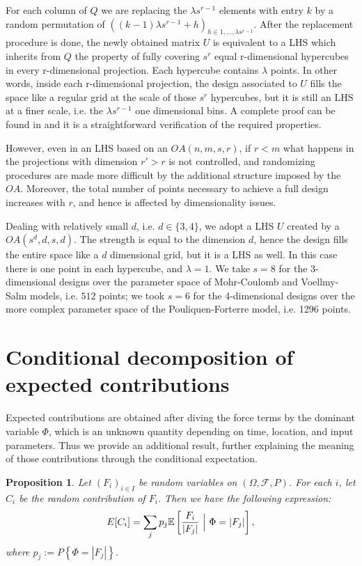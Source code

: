 \documentclass{article}
\newtheorem{proposition}[theorem]{Proposition}
\begin{document}
For each column of $Q$ we are replacing the $\lambda s^{r-1}$ elements with entry $k$ by a random permutation of $\left((k-1)\lambda s^{r-1} + h\right)_{h\in 1,\dots, \lambda s^{r-1}}$. After the replacement procedure is done, the newly obtained matrix $U$ is equivalent to a LHS which inherits from $Q$ the property of fully covering $s^r$ equal r-dimensional hypercubes in every r-dimensional projection. Each hypercube contains $\lambda$ points. In other words, inside each r-dimensional projection, the design associated to $U$ fills the space like a regular grid at the scale of those $s^r$ hypercubes, but it is still an LHS at a finer scale, i.e. the $\lambda s^{r-1}$ one dimensional bins. A complete proof can be found in \cite{Tang1993} and it is a straightforward verification of the required properties.

However, even in an LHS based on an $OA(n,m,s,r)$, if $r<m$ what happens in the projections with dimension $r'>r$ is not controlled, and randomizing procedures are made more difficult by the additional structure imposed by the $OA$. Moreover, the total number of points necessary to achieve a full design increases with $r$, and hence is affected by dimensionality issues.

Dealing with relatively small $d$, i.e. $d\in\{3,4\}$, we adopt a LHS $U$ created by a $OA(s^d,d,s,d)$. The strength is equal to the dimension $d$, hence the design fills the entire space like a $d$ dimensional grid, but it is a LHS as well. In this case there is one point in each hypercube, and $\lambda=1$. We take $s=8$ for the 3-dimensional designs over the parameter space of Mohr-Coulomb and Voellmy-Salm models, i.e. $512$ points; we took $s=6$ for the 4-dimensional designs over the more complex parameter space of the Pouliquen-Forterre model, i.e. 1296 points.

\section{Conditional decomposition of expected contributions}\label{A-2}
Expected contributions are obtained after diving the force terms by the dominant variable $\Phi$, which is an unknown quantity depending on time, location, and input parameters. Thus we provide an additional result, further explaining the meaning of those contributions through the conditional expectation.

\begin{proposition}
Let $(F_i)_{i\in I}$ be random variables on $(\Omega, \mathcal F, P)$. For each $i$, let $C_i$ be the random contribution of $F_i$. Then we have the following expression:
$$E[C_i]=\sum_j p_j \mathbb E\left[\frac{F_i}{|F_j|}\ \Big{|}\ \Phi=|F_j|\right],$$
where $p_j:=P\left\{\Phi=|F_j|\right\}$.
\end{proposition}
\end{document}
